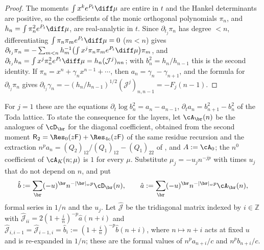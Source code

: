 \begin{proof}
The moments $\int x^ke^{P_t}\diff\mu$ are entire in $t$ and the Hankel determinants are positive, so the coefficients of the monic
orthogonal polynomials $\pi_n$, and $h_n=\int\pi_n^2e^{P_t}\diff\mu$, are real-analytic in $t$. Since $\partial_{t_j}\pi_n$ has degree $<n$,
differentiating $\int\pi_n\pi_me^{P_t}\diff\mu=0$ ($m<n$) gives $\partial_{t_j}\pi_n=-\sum_{m<n}h_m^{-1}\bigl(\int x^j\pi_n\pi_me^{P_t}\diff\mu\bigr)\pi_m$,
and $\partial_{t_j}h_n=\int x^j\pi_n^2e^{P_t}\diff\mu=h_n(\mathcal J^j)_{nn}$; with $b_n^2=h_n/h_{n-1}$ this is the second identity. If
$\pi_n=x^n+\gamma_nx^{n-1}+\dotsb$, then $a_n=\gamma_n-\gamma_{n+1}$, and the formula for $\partial_{t_j}\pi_n$ gives
$\partial_{t_j}\gamma_n=-(h_n/h_{n-1})^{1/2}(\mathcal J^j)_{n,n-1}=-F_j(n-1)$.
\end{proof}

For $j=1$ these are the equations $\partial_t\log b_n^2=a_n-a_{n-1}$, $\partial_ta_n=b_{n+1}^2-b_n^2$ of the Toda lattice. To state the
consequence for the layers, let $\cA_{\br}(n)$ be the analogues of $\cD_{\br}$ for the diagonal coefficient, obtained from the second
moment $\mathsf R_2=\Res_0(z\mathsf F)+\Res_{4c}(z\mathsf F)$ of the same residue recursion and the extraction
$n^pa_n=(Q_2)_{12}/(Q_1)_{12}-(Q_1)_{22}$ of \cite{PaperII}, and $A:=\cA_0$; the $n^0$ coefficient of $\cA_K(n;\mu)$ is $1$ for every
$\mu$. Substitute $\mu_j=-u_jn^{-jp}$ with times $u_j$ that do not depend on $n$, and put
\[
  \hat b:=\sum_{\br}(-u)^{\br}n^{-|\br|_wp}\cD_{\br}(n),\qquad\hat a:=\sum_{\br}(-u)^{\br}n^{-|\br|_wp}\cA_{\br}(n),
\]
formal series in $1/n$ and the $u_j$. Let $\hat{\mathcal J}$ be the tridiagonal matrix indexed by $i\in\mathbb Z$ with
$\hat{\mathcal J}_{ii}=2(1+\frac in)^{-p}\hat a(n+i)$ and $\hat{\mathcal J}_{i,i-1}=\hat{\mathcal J}_{i-1,i}=\hat b_i:=(1+\frac in)^{-p}\hat b(n+i)$,
where $n\mapsto n+i$ acts at fixed $u$ and is re-expanded in $1/n$; these are the formal values of $n^pa_{n+i}/c$ and $n^pb_{n+i}/c$.

